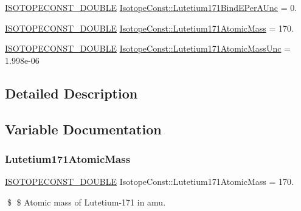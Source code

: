 \begin{DoxyCompactItemize}
\mbox{\hyperlink{group___isotope_const-_macros_ga8f45a7272ce02c0b4c65c44636ed719a}{I\+S\+O\+T\+O\+P\+E\+C\+O\+N\+S\+T\+\_\+\+D\+O\+U\+B\+LE}} \mbox{\hyperlink{group___isotope_const-_lutetium-_lu171_ga11122793ceeb309aa169da15abba5eff}{Isotope\+Const\+::\+Lutetium171\+Bind\+E\+Per\+A\+Unc}} = 0.
\item 
\mbox{\hyperlink{group___isotope_const-_macros_ga8f45a7272ce02c0b4c65c44636ed719a}{I\+S\+O\+T\+O\+P\+E\+C\+O\+N\+S\+T\+\_\+\+D\+O\+U\+B\+LE}} \mbox{\hyperlink{group___isotope_const-_lutetium-_lu171_ga25025933f72e239f22a6d0b843d4060e}{Isotope\+Const\+::\+Lutetium171\+Atomic\+Mass}} = 170.
\item 
\mbox{\hyperlink{group___isotope_const-_macros_ga8f45a7272ce02c0b4c65c44636ed719a}{I\+S\+O\+T\+O\+P\+E\+C\+O\+N\+S\+T\+\_\+\+D\+O\+U\+B\+LE}} \mbox{\hyperlink{group___isotope_const-_lutetium-_lu171_gaf4ca4ddaf5f814e50aa84bb44ef230ad}{Isotope\+Const\+::\+Lutetium171\+Atomic\+Mass\+Unc}} = 1.\+998e-\/06
\end{DoxyCompactItemize}


\subsection{Detailed Description}


\subsection{Variable Documentation}
\mbox{\label{group___isotope_const-_lutetium-_lu171_ga25025933f72e239f22a6d0b843d4060e}} 
\subsubsection{\texorpdfstring{Lutetium171\+Atomic\+Mass}{Lutetium171AtomicMass}}
{\footnotesize\ttfamily \mbox{\hyperlink{group___isotope_const-_macros_ga8f45a7272ce02c0b4c65c44636ed719a}{I\+S\+O\+T\+O\+P\+E\+C\+O\+N\+S\+T\+\_\+\+D\+O\+U\+B\+LE}} Isotope\+Const\+::\+Lutetium171\+Atomic\+Mass = 170.}

\$ \$ Atomic mass of Lutetium-\/171 in amu. \mbox{\label{group___isotope_const-_lutetium-_lu171_gaf4ca4ddaf5f814e50aa84bb44ef230ad}} 
